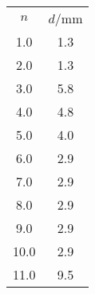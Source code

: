 \begin{table}
\begin{tabular}{cc}
$n$ & $d$/$\si{\milli\meter}$ \\
1.0 & 1.3 \\
2.0 & 1.3 \\
3.0 & 5.8 \\
4.0 & 4.8 \\
5.0 & 4.0 \\
6.0 & 2.9 \\
7.0 & 2.9 \\
8.0 & 2.9 \\
9.0 & 2.9 \\
10.0 & 2.9 \\
11.0 & 9.5 \\
\end{tabular}
\end{table}
